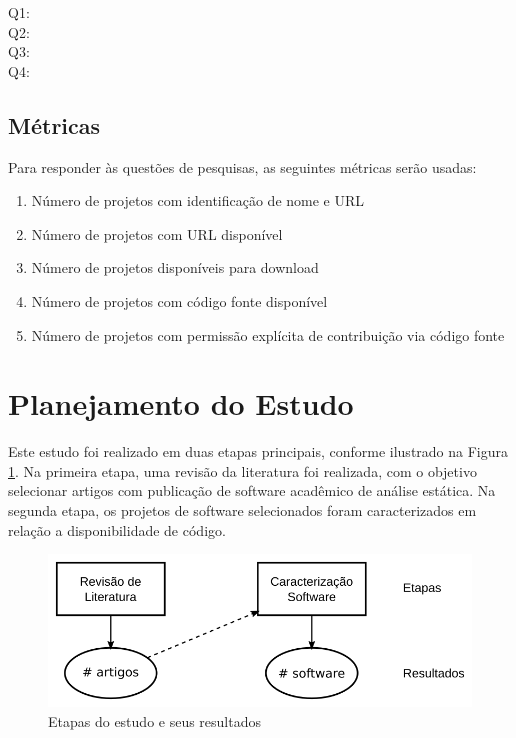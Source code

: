 \begin{description}
  \item [Q1:] \EstudoUmQuestaoUm
  \item [Q2:] \EstudoUmQuestaoDois
  \item [Q3:] \EstudoUmQuestaoTres
  \item [Q4:] \EstudoUmQuestaoQuatro
\end{description}

\subsection{Métricas}

Para responder às questões de pesquisas, as seguintes métricas serão usadas:

\begin{enumerate}
  \item Número de projetos com identificação de nome e URL
  \item Número de projetos com URL disponível
  \item Número de projetos disponíveis para download
  \item Número de projetos com código fonte disponível
  \item Número de projetos com permissão explícita de contribuição via código fonte
\end{enumerate}


\section{Planejamento do Estudo} \label{estudo1:planejamento} %

Este estudo foi realizado em duas etapas principais, conforme ilustrado na
Figura \ref{estudo1-etapas}. Na primeira etapa, uma revisão da literatura
foi realizada, com o objetivo selecionar
artigos com publicação de software acadêmico de análise estática. 
Na segunda etapa, os projetos de software selecionados foram caracterizados
em relação a disponibilidade de código.

\begin{figure}[h]
  \center
  \includegraphics[scale=0.4]{imagens/estudo1-etapas.png}
  \caption{Etapas do estudo e seus resultados}
  \label{estudo1-etapas}
\end{figure}


